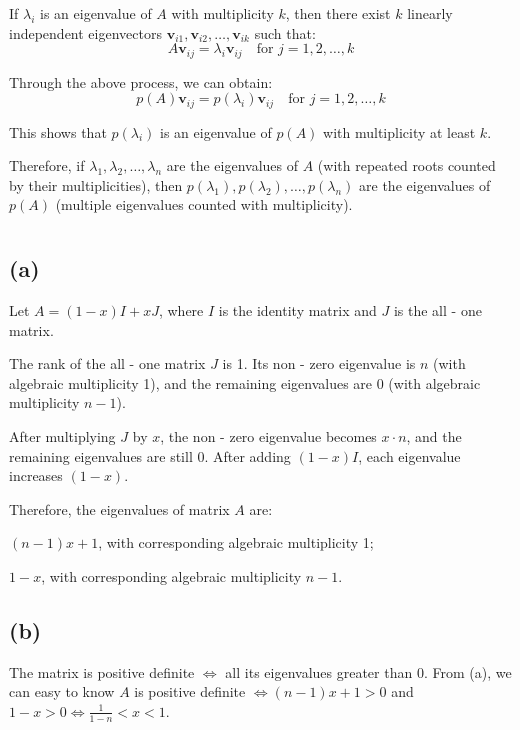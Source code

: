 \documentclass{article}
\begin{document}
If $ \lambda_i $ is an eigenvalue of $ A $ with multiplicity $ k $, then there exist $ k $ linearly independent eigenvectors $ \mathbf{v}_{i1}, \mathbf{v}_{i2}, \ldots, \mathbf{v}_{ik} $ such that:
$$
A\mathbf{v}_{ij} = \lambda_i\mathbf{v}_{ij} \quad \text{for } j = 1, 2, \ldots, k
$$

Through the above process, we can obtain:
$$
p(A)\mathbf{v}_{ij} = p(\lambda_i)\mathbf{v}_{ij} \quad \text{for } j = 1, 2, \ldots, k
$$

This shows that $ p(\lambda_i) $ is an eigenvalue of $ p(A) $ with multiplicity at least $ k $.

Therefore, if $ \lambda_1, \lambda_2, \ldots, \lambda_n $ are the eigenvalues of $ A $ (with repeated roots counted by their multiplicities), then $ p(\lambda_1), p(\lambda_2), \ldots, p(\lambda_n) $ are the eigenvalues of $ p(A) $ (multiple eigenvalues counted with multiplicity).

\section{}

\subsection*{(a)} 

Let $ A = (1 - x)I + xJ $, where $ I $ is the identity matrix and $ J $ is the all - one matrix.

The rank of the all - one matrix $ J $ is 1. Its non - zero eigenvalue is $ n $ (with algebraic multiplicity 1), and the remaining eigenvalues are 0 (with algebraic multiplicity $ n - 1 $).

After multiplying $ J $ by $ x $, the non - zero eigenvalue becomes $ x\cdot n $, and the remaining eigenvalues are still 0. After adding $ (1 - x)I $, each eigenvalue increases $ (1 - x) $.

Therefore, the eigenvalues of matrix $ A $ are:

$ (n-1)x+1 $, with corresponding algebraic multiplicity 1;

$ 1 - x $, with corresponding algebraic multiplicity $ n - 1 $.


\subsection*{(b)} 

The matrix is positive definite $\Leftrightarrow$ all its eigenvalues greater than 0. From (a), we can easy to know $A$ is positive definite $\Leftrightarrow (n-1)x+1 >0 $ and $ 1 - x>0 \Leftrightarrow \frac{1}{1-n}<x<1$.
\end{document}
